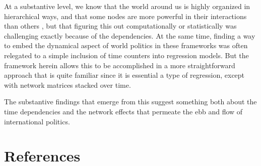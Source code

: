 \documentclass[3p,times,twocolumn,authoryear,12pt]{elsarticle}
\begin{document}
At a substantive level, we know that the world around us is highly organized in hierarchical 
ways, and that some nodes are more powerful in their interactions than others \citep{house:ward:1988,house:ward:1988a}, but that figuring this out computationally or statistically was challenging exactly because of the dependencies. At the same time, finding a way to embed the dynamical aspect of world politics in these frameworks was often relegated to a simple inclusion of time counters into regression models. But the framework herein allows this to be accomplished in a more straightforward approach that is quite familiar since it is essential a type of regression, except with network matrices stacked over time.  

The substantive findings that emerge from this suggest something both about the time dependencies and the network effects that permeate the ebb and flow of international politics. 






\section*{References}
%  


\end{document}
